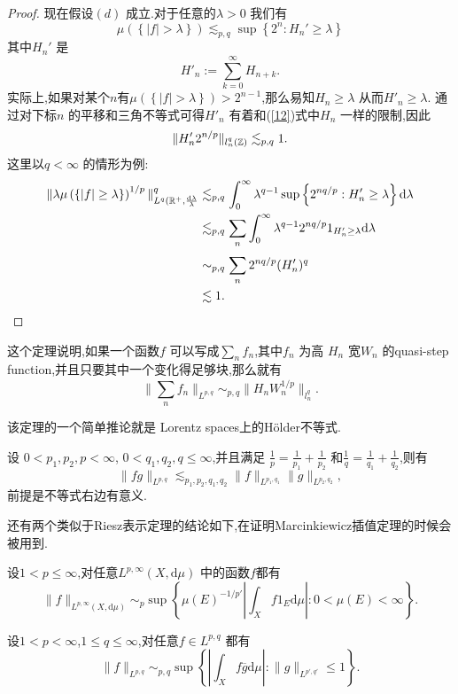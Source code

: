 \begin{proof}
  现在假设$(d)$ 成立.对于任意的$\lambda >0$ 我们有
  \[
  \mu\left( \left\{ |f|>\lambda \right\}  \right) \lesssim_{p,q}\sup \left\{ 2^{n}:H_n'\ge \lambda \right\} 
  \] 
  其中$H_n'$ 是
  \[
  H'_n:=\sum_{k=0}^{\infty} H_{n+k}.
  \]
  实际上,如果对某个$n$有$\mu\left( \left\{ |f|>\lambda \right\}  \right) >2^{n-1}$,那么易知$H_n\ge \lambda$ 从而$H'_n\ge \lambda$.
  通过对下标$n$ 的平移和三角不等式可得$H'_n$ 有着和(\ref{12})式中$H_n$ 一样的限制,因此
  \[
    \| H'_n 2^{n /p}\|_{l^{q}_{n}(\mathbb{Z})}\lesssim_{p,q} 1.
  \] 
  这里以$q<\infty$ 的情形为例:
  \begin{equation*}
    \begin{aligned}
      \|\lambda \mu\left( \left\{ |f|\ge \lambda \right\}  \right) ^{1 /p}\|^{q}_{L^{q}(\mathbb{R}^{+}, \frac{\mathrm{d}\lambda}{\lambda}} & \lesssim_{p,q} \int_{0}^{\infty}\lambda^{q-1}\sup \left\{ 2^{nq /p}:H'_n\ge \lambda \right\} \mathrm{d}\lambda\\
     & \lesssim_{p,q} \sum_{n}^{} \int_0^{\infty}\lambda^{q-1}2^{nq /p} 1_{H'_n\ge \lambda}\mathrm{d}\lambda\\
     & \sim_{p,q}  \sum_{n}^{} 2^{nq /p}(H'_n)^{q}\\
     & \lesssim  1.
    \end{aligned}
  \end{equation*}
\end{proof}
这个定理说明,如果一个函数$f$ 可以写成$\sum_{n}^{} f_n$,其中$f_n$ 为高 $H_n$ 宽$W_n$ 的quasi-step function,并且只要其中一个变化得足够块,那么就有
\[
\|\sum_{n}^{} f_n\|_{L^{p,q}}\sim_{p,q}\|H_n W_n^{1 /p}\|_{l^{q}_n}.
\]

该定理的一个简单推论就是 Lorentz spaces上的H\"{o}lder不等式.
\begin{theorem}
 设 $0<p_1,p_2,p<\infty$, $0<q_1,q_2,q\le \infty$,并且满足 $\frac{1}{p}=\frac{1}{p_1}+\frac{1}{p_2}$ 和$\frac{1}{q}=\frac{1}{q_1}+\frac{1}{q_2}$,则有
 \[
 \|fg\|_{L^{p,q}}\lesssim_{p_1,p_2,q_1,q_2}\|f\|_{L^{p_1,q_1}}\|g\|_{L^{p_2,q_2}},
 \] 
 前提是不等式右边有意义.
\end{theorem}

还有两个类似于Riesz表示定理的结论如下,在证明Marcinkiewicz插值定理的时候会被用到.
\begin{theorem}
  设$1<p\le \infty $,对任意$L^{p,\infty}(X,\mathrm{d}\mu)$ 中的函数$f$都有
   \begin{equation}
     \|f\|_{L^{p,\infty}(X,\mathrm{d}\mu)}\sim_p \sup\left\{ \mu(E)^{-1 /p'} |\int_Xf 1_E \mathrm{d}\mu|:0<\mu(E)<\infty \right\}. 
  \end{equation}
\end{theorem}
\begin{theorem}\label{thm1-1}
  设$1<p<\infty$,$1\le q\le \infty$,对任意$f\in L^{p,q}$ 都有
  \begin{equation}
    \|f\|_{L^{p,q}}\sim_{p,q}\sup\left\{ |\int_{X}f\overline{g}\mathrm{d}\mu|:\|g\|_{L^{p',q'}}\le 1 \right\}. 
  \end{equation}
\end{theorem}

